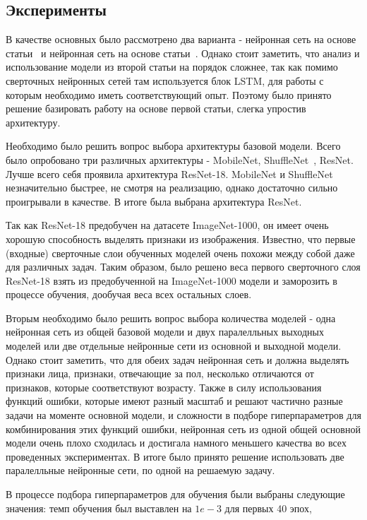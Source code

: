 \subsection{Эксперименты}\label{subsec:эксперименты}
В качестве основных было рассмотрено два варианта - нейронная сеть на основе статьи~\cite{ror} и нейронная сеть на основе статьи~\cite{lstm}.
Однако стоит заметить, что анализ и использование модели из второй статьи на порядок сложнее, так как помимо сверточных нейронных сетей там используется блок LSTM,
для работы с которым необходимо иметь соответствующий опыт.
Поэтому было принято решение базировать работу на основе первой статьи, слегка упростив архитектуру.
\par Необходимо было решить вопрос выбора архитектуры базовой модели.
Всего было опробовано три различных архитектуры - MobileNet, ShuffleNet~\cite{shuffle}, ResNet.
Лучше всего себя проявила архитектура ResNet-18.
MobileNet и ShuffleNet незначительно быстрее, не смотря на реализацию, однако достаточно сильно проигрывали в качестве.
В итоге была выбрана архитектура ResNet.
\par Так как ResNet-18 предобучен на датасете ImageNet-1000, он имеет очень хорошую способность выделять признаки из изображения.
Известно, что первые (входные) сверточные слои обученных моделей очень похожи между собой даже для различных задач.
Таким образом, было решено веса первого сверточного слоя ResNet-18 взять из предобученной на ImageNet-1000 модели и заморозить в процессе обучения,
дообучая веса всех остальных слоев.
\par Вторым необходимо было решить вопрос выбора количества моделей - одна нейронная сеть из общей базовой модели и двух паралелльных выходных моделей
или две отдельные нейронные сети из основной и выходной модели.
Однако стоит заметить, что для обеих задач нейронная сеть и должна выделять признаки лица, признаки,
отвечающие за пол, несколько отличаются от признаков, которые соответствуют возрасту.
Также в силу использования функций ошибки,
которые имеют разный масштаб и решают частично разные задачи на моменте основной модели,
и сложности в подборе гиперпараметров для комбинирования этих функций ошибки,
нейронная сеть из одной общей основной модели очень плохо сходилась и достигала намного меньшего качества во всех проведенных экспериментах.
В итоге было принято решение использовать две паралелльные нейронные сети, по одной на решаемую задачу.
\par В процессе подбора гиперпараметров для обучения были выбраны следующие значения: темп обучения был выставлен на $1e-3$ для первых 40 эпох,
